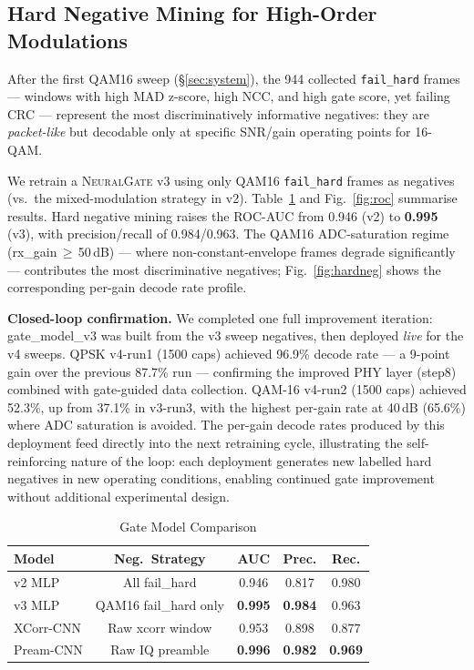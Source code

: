 \documentclass[conference]{IEEEtran}
\newcommand{\gate}{\textsc{NeuralGate}}
\begin{document}
\subsection{Hard Negative Mining for High-Order Modulations}
\label{sec:hardneg}

After the first QAM16 sweep (§\ref{sec:system}), the 944 collected
\texttt{fail\_hard} frames — windows with high MAD z-score, high NCC,
and high gate score, yet failing CRC — represent the most
discriminatively informative negatives:
they are \emph{packet-like} but decodable only at specific SNR/gain
operating points for 16-QAM.

We retrain a \gate{} v3 using only QAM16 \texttt{fail\_hard} frames
as negatives (vs.\ the mixed-modulation strategy in v2).
Table~\ref{tab:gate_compare} and Fig.~\ref{fig:roc} summarise results.
Hard negative mining raises the ROC-AUC from 0.946 (v2) to
\textbf{0.995} (v3), with precision/recall of 0.984/0.963.
The QAM16 ADC-saturation regime (rx\_gain\,$\geq$\,50\,dB) — where
non-constant-envelope frames degrade significantly — contributes the
most discriminative negatives; Fig.~\ref{fig:hardneg} shows the
corresponding per-gain decode rate profile.

\textbf{Closed-loop confirmation.}
We completed one full improvement iteration: gate\_model\_v3 was built
from the v3 sweep negatives, then deployed \emph{live} for the v4 sweeps.
QPSK v4-run1 (1500 caps) achieved 96.9\% decode rate — a 9-point gain
over the previous 87.7\% run — confirming the improved PHY layer (step8)
combined with gate-guided data collection.
QAM-16 v4-run2 (1500 caps) achieved 52.3\%, up from 37.1\% in v3-run3,
with the highest per-gain rate at 40\,dB (65.6\%) where ADC saturation
is avoided.
The per-gain decode rates produced by this deployment feed directly into
the next retraining cycle, illustrating the self-reinforcing nature of the
loop: each deployment generates new labelled hard negatives in new
operating conditions, enabling continued gate improvement without
additional experimental design.

\begin{table}[t]
  \centering
  \caption{Gate Model Comparison}
  \label{tab:gate_compare}
  \renewcommand{\arraystretch}{1.15}
  \begin{tabular}{lcccc}
    \toprule
    Model & Neg.\ Strategy & AUC & Prec. & Rec. \\
    \midrule
    v2 MLP & All fail\_hard & 0.946 & 0.817 & 0.980 \\
    v3 MLP & QAM16 fail\_hard only & \textbf{0.995} & \textbf{0.984} & 0.963 \\
    XCorr-CNN & Raw xcorr window & 0.953 & 0.898 & 0.877 \\
    Pream-CNN & Raw IQ preamble & \textbf{0.996} & \textbf{0.982} & \textbf{0.969} \\
    \bottomrule
  \end{tabular}
\end{table}
\end{document}
